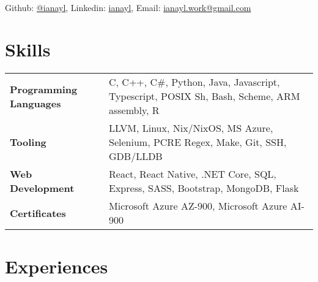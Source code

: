 \documentclass[9pt]{article}
\author{Ian Li}
\makeatletter
\renewcommand{\maketitle}{
		\vspace{-7em}
    \begin{center}
		{\huge\bfseries
		\theauthor}
    \vspace{0.5em}
    \\
    Github: \href{https://github.com/ianayl}{@ianayl}, Linkedin: \href{https://www.linkedin.com/in/ianayl}{ianayl}, Email: \url{ianayl.work@gmail.com}
    \end{center}
    \vspace{-1.0em}
}
\makeatother
\begin{document}
\maketitle


\section{Skills}

\begin{tabular}{ l l }
    \textbf{Programming Languages} & C, C++, C\#, Python, Java, Javascript, Typescript, POSIX Sh, Bash, Scheme, ARM assembly, R \\
    \textbf{Tooling} & LLVM, Linux, Nix/NixOS, MS Azure, Selenium, PCRE Regex, Make, Git, SSH, GDB/LLDB \\
    \textbf{Web Development} & React, React Native, .NET Core, SQL, Express, SASS, Bootstrap, MongoDB, Flask \\
    \textbf{Certificates} & Microsoft Azure AZ-900, Microsoft Azure AI-900
\end{tabular}

\section*{Experiences}

\end{document}
